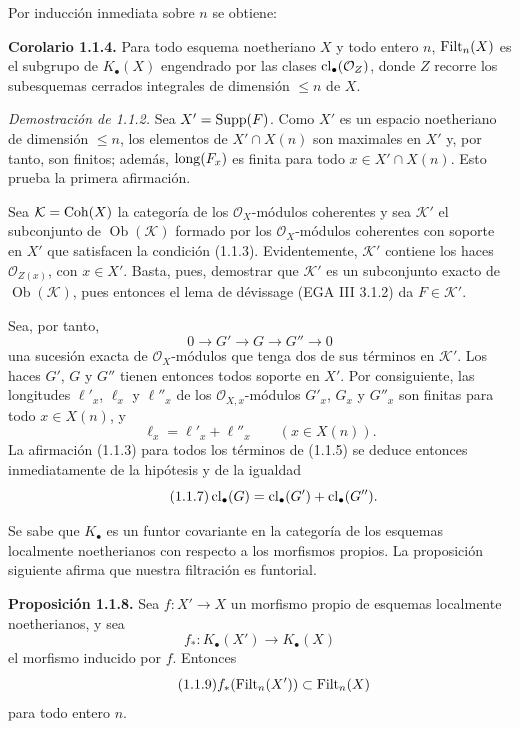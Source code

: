 Por inducción inmediata sobre $n$ se obtiene:

\textbf{Corolario 1.1.4.}
Para todo esquema noetheriano $X$ y todo entero $n$, $\operatorname{Filt}_n(X)$ es el
subgrupo de $K_\bullet(X)$ engendrado por las clases
$\operatorname{cl}_\bullet(\mathcal O_Z)$, donde $Z$ recorre los subesquemas cerrados
integrales de dimensión $\leq n$ de $X$.

\emph{Demostración de 1.1.2.}
Sea $X'=\operatorname{Supp}(F)$. Como $X'$ es un espacio noetheriano de dimensión $\leq n$,
los elementos de $X'\cap X(n)$ son maximales en $X'$ y, por tanto, son
finitos; además, $\operatorname{long}(F_x)$ es finita para todo $x\in X'\cap X(n)$. Esto
prueba la primera afirmación.

Sea $\mathcal K=\operatorname{Coh}(X)$ la categoría de los $\mathcal O_X$-módulos coherentes
y sea $\mathcal K'$ el subconjunto de $\operatorname{Ob}(\mathcal K)$ formado
por los $\mathcal O_X$-módulos coherentes con soporte en $X'$ que satisfacen
la condición (1.1.3). Evidentemente, $\mathcal K'$ contiene los haces
$\mathcal O_{Z(x)}$, con $x\in X'$. Basta, pues, demostrar que $\mathcal K'$ es
un subconjunto exacto de $\operatorname{Ob}(\mathcal K)$, pues entonces el
lema de dévissage (EGA III 3.1.2) da $F\in\mathcal K'$.

Sea, por tanto,
\begin{equation}\tag{1.1.5}
0\longrightarrow G'\longrightarrow G\longrightarrow G''\longrightarrow0
\end{equation}
una sucesión exacta de $\mathcal O_X$-módulos que tenga dos de sus términos en
$\mathcal K'$. Los haces $G'$, $G$ y $G''$ tienen entonces todos soporte en
$X'$. Por consiguiente, las longitudes $\ell'_x$, $\ell_x$ y $\ell''_x$ de los
$\mathcal O_{X,x}$-módulos $G'_x$, $G_x$ y $G''_x$ son finitas para todo
$x\in X(n)$, y
\begin{equation}\tag{1.1.6}
\ell_x=\ell'_x+\ell''_x\qquad(x\in X(n)).
\end{equation}
La afirmación (1.1.3) para todos los términos de (1.1.5) se deduce entonces
inmediatamente de la hipótesis y de la igualdad
\begin{equation}\tag{1.1.7}
\operatorname{cl}_\bullet(G)=\operatorname{cl}_\bullet(G')+\operatorname{cl}_\bullet(G'').
\end{equation}

Se sabe que $K_\bullet$ es un funtor covariante en la categoría de los esquemas
localmente noetherianos con respecto a los morfismos propios. La proposición
siguiente afirma que nuestra filtración es funtorial.

\textbf{Proposición 1.1.8.}
Sea $f:X'\to X$ un morfismo propio de esquemas localmente noetherianos, y sea
\[
f_*:K_\bullet(X')\longrightarrow K_\bullet(X)
\]
el morfismo inducido por $f$. Entonces
\begin{equation}\tag{1.1.9}
f_*(\operatorname{Filt}_n(X'))\subset\operatorname{Filt}_n(X)
\end{equation}
para todo entero $n$.

